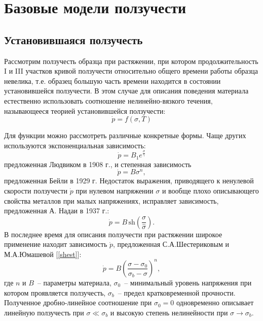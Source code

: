 \section{Базовые модели ползучести}

\subsection{Установившаяся ползучесть}
Рассмотрим ползучесть образца при растяжении, при котором продолжительность I и III участков кривой ползучести относительно общего времени работы образца невелика, т.е. образец большую часть времени находится в состоянии установившейся ползучести. 
В этом случае для описания поведения материала естественно использовать соотношение нелинейно-вязкого течения, называющееся теорией установившейся ползучести:
 \begin{equation}
 	\dot{p} = f(\sigma, T)
 \end{equation}
 
Для функции  можно рассмотреть различные конкретные формы. Чаще других используются экспоненциальная зависимость:
\begin{equation} 
	\dot{p} = B_1e^{\frac{\sigma}{\gamma}}
\end{equation}
предложенная Людвиком в 1908 г., и степенная зависимость
\begin{equation} 
	\dot{p} = B\sigma^n,
\end{equation}
предложенная Бейли в 1929 г. Недостаток выражения, приводящего к ненулевой скорости ползучести $\dot{p}$ при нулевом напряжении $\sigma$ и вообще плохо описывающего свойства металлов при малых напряжениях, исправляет зависимость, предложенная А. Надаи в 1937 г.:
\begin{equation}
	\dot{p} = B\, \text{sh}(\dfrac{\sigma}{\widehat{\sigma}}).
\end{equation}
В последнее время для описания ползучести при растяжении широкое применение находит зависимость $\dot{p}$, предложенная С.А.Шестериковым и М.А.Юмашевой [\ref{shest}]:
\begin{equation}
	\dot{p} = B\left(\dfrac{\sigma-\sigma_0}{\sigma_b-\sigma}\right)^n,
\end{equation}
где $n$ и $B$~-- параметры материала, $\sigma_0$~-- минимальный уровень напряжения при котором проявляется ползучесть, $\sigma_b$~-- предел кратковременной прочности.
Полученное дробно-линейное соотношение при $\sigma_0 = 0$ одновременно описывает линейную ползучесть при $\sigma \ll \sigma_b$ и высокую степень нелинейности при $\sigma \to \sigma_b$.


